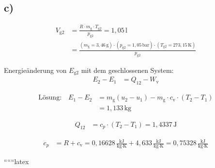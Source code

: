 

\subsection*{c)}

\begin{align*}
V_{\text{g2}} &= \frac{R \cdot m_{\text{g}} \cdot T_{\text{g2}}}{p_{\text{g2}}} = 1,05 \, \text{l} \\
&= \frac{(m_{\text{g}} = 3,46 \, \text{g}) \cdot (p_{\text{g2}} = 1,05 \, \text{bar}) \cdot (T_{\text{g2}} = 273,15 \, \text{K})}{p_{\text{g2}}}
\end{align*}

Energieänderung von $E_{\text{g2}}$ mit dem geschlossenen System:
\begin{align*}
E_2 - E_1 &= Q_{12} - W_{\text{v}}
\end{align*}

\begin{align*}
\text{Lösung:} \quad E_1 - E_2 &= m_{\text{g}} (u_2 - u_1) - m_{\text{g}} \cdot c_{\text{v}} \cdot (T_2 - T_1) \\
&= 1,133 \, \text{kg}
\end{align*}

\begin{align*}
Q_{12} &= c_p \cdot (T_2 - T_1) = 1,4337 \, \text{J}
\end{align*}

\begin{align*}
c_p &= R + c_{\text{v}} = 0,16628 \, \frac{\text{kJ}}{\text{kg} \cdot \text{K}} + 4,633 \, \frac{\text{kJ}}{\text{kg} \cdot \text{K}} = 0,75328 \, \frac{\text{kJ}}{\text{kg} \cdot \text{K}}
\end{align*}

``````latex